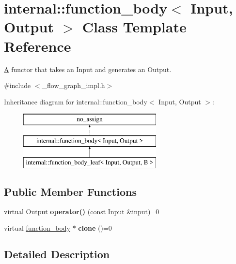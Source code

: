\hypertarget{classinternal_1_1function__body}{}\section{internal\+:\+:function\+\_\+body$<$ Input, Output $>$ Class Template Reference}
\label{classinternal_1_1function__body}


\hyperlink{structA}{A} functor that takes an Input and generates an Output.  




{\ttfamily \#include $<$\+\_\+flow\+\_\+graph\+\_\+impl.\+h$>$}

Inheritance diagram for internal\+:\+:function\+\_\+body$<$ Input, Output $>$\+:\begin{figure}[H]
\begin{center}
\leavevmode
\includegraphics[height=3.000000cm]{classinternal_1_1function__body}
\end{center}
\end{figure}
\subsection*{Public Member Functions}
\begin{DoxyCompactItemize}
\item 
\hypertarget{classinternal_1_1function__body_ac5f30f35aeb61c2f374ba85307151235}{}virtual Output {\bfseries operator()} (const Input \&input)=0\label{classinternal_1_1function__body_ac5f30f35aeb61c2f374ba85307151235}

\item 
\hypertarget{classinternal_1_1function__body_a32c1b1cd78581f908697b27c8db9014e}{}virtual \hyperlink{classinternal_1_1function__body}{function\+\_\+body} $\ast$ {\bfseries clone} ()=0\label{classinternal_1_1function__body_a32c1b1cd78581f908697b27c8db9014e}

\end{DoxyCompactItemize}


\subsection{Detailed Description}

